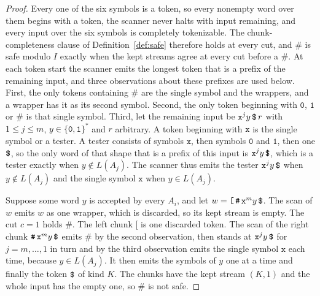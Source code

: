 \documentclass[11pt,a4paper]{article}
\theoremstyle{definition}
\theoremstyle{plain}
\newcommand{\code}[1]{\texttt{#1}}
\begin{document}
\begin{proof}
Every one of the six symbols is a token, so every nonempty word over them begins with a token, the scanner never halts
with input remaining, and every input over the six symbols is completely tokenizable. The chunk-completeness clause of
Definition~\ref{def:safe} therefore holds at every cut, and $\code{\#}$ is safe modulo $I$ exactly when the kept streams
agree at every cut before a $\code{\#}$. At each token start the scanner emits the longest token that is a prefix of the
remaining input, and three observations about these prefixes are used below. First, the only tokens containing
$\code{\#}$ are the single symbol and the wrappers, and a wrapper has it as its second symbol. Second, the only token
beginning with $\code{0}$, $\code{1}$ or $\code{\#}$ is that single symbol. Third, let the remaining input be
$\code{x}^j y\,\code{\symbol{36}}\,r$ with $1 \leq j \leq m$, $y \in \{\code{0}, \code{1}\}^*$ and $r$ arbitrary. A
token beginning with $\code{x}$ is the single symbol or a tester. A tester consists of symbols $\code{x}$, then symbols
$\code{0}$ and $\code{1}$, then one $\code{\symbol{36}}$, so the only word of that shape that is a prefix of this input
is $\code{x}^j y\,\code{\symbol{36}}$, which is a tester exactly when $y \notin L(A_j)$. The scanner thus emits the
tester $\code{x}^j y\,\code{\symbol{36}}$ when $y \notin L(A_j)$ and the single symbol $\code{x}$ when $y \in L(A_j)$.

Suppose some word $y$ is accepted by every $A_i$, and let $w = \code{[}\,\code{\#}\,\code{x}^m y\,\code{\symbol{36}}$.
The scan of $w$ emits $w$ as one wrapper, which is discarded, so its kept stream is empty. The cut $c = 1$ holds
$\code{\#}$. The left chunk $\code{[}$ is one discarded token. The scan of the right chunk
$\code{\#}\,\code{x}^m y\,\code{\symbol{36}}$ emits $\code{\#}$ by the second observation, then stands at
$\code{x}^j y\,\code{\symbol{36}}$ for $j = m, \ldots, 1$ in turn and by the third observation emits the single symbol
$\code{x}$ each time, because $y \in L(A_j)$. It then emits the symbols of $y$ one at a time and finally the token
$\code{\symbol{36}}$ of kind $K$. The chunks have the kept stream $(K, 1)$ and the whole input has the empty one, so
$\code{\#}$ is not safe.


\end{proof}
\end{document}
